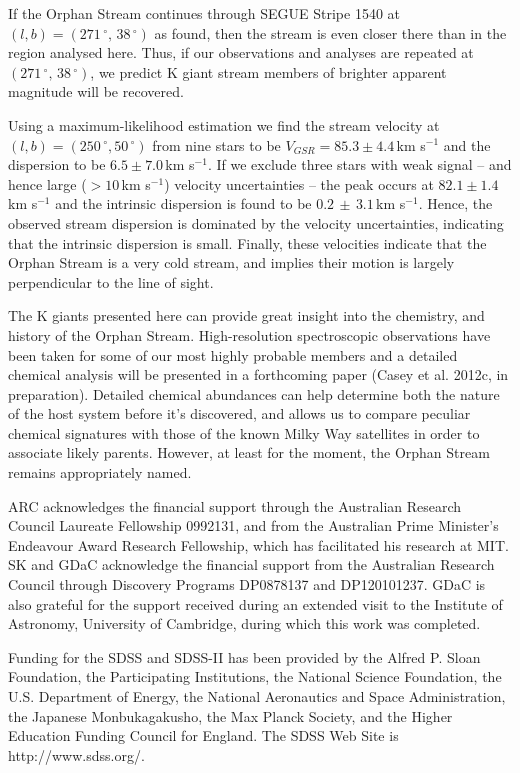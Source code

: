\documentclass{emulateapj}
\begin{document}
If the Orphan Stream continues through SEGUE Stripe 1540 at $(l, b) = (271\,^\circ,\,38\,^\circ)$ as \citet{Newberg;et-al_2010} found, then the stream is even closer there than in the region analysed here. Thus, if our observations and analyses are repeated at $(271\,^\circ,\,38\,^\circ)$, we predict K giant stream members of brighter apparent magnitude will be recovered.

Using a maximum-likelihood estimation we find the stream velocity at $(l, b) = (250\,^\circ, 50\,^\circ)$ from nine stars to be $V_{GSR} = 85.3 \pm 4.4$\,km s$^{-1}$ and the dispersion to be $6.5 \pm 7.0$\,km s$^{-1}$. If we exclude three stars with weak signal \--- and hence large ($> 10$\,km s$^{-1}$) velocity uncertainties \--- the peak occurs at $82.1 \pm 1.4$\,km s$^{-1}$ and the intrinsic dispersion is found to be $0.2\,\pm\,3.1$\,km s$^{-1}$. Hence, the observed stream dispersion is dominated by the velocity uncertainties, indicating that the intrinsic dispersion is small. Finally, these velocities indicate that the Orphan Stream is a very cold stream, and implies their motion is largely perpendicular to the line of sight.

The K giants presented here can provide great insight into the chemistry, and history of the Orphan Stream. High-resolution spectroscopic observations have been taken for some of our most highly probable members and a detailed chemical analysis will be presented in a forthcoming paper (Casey et al. 2012c, in preparation). Detailed chemical abundances can help determine both the nature of the host system before it's discovered, and allows us to compare peculiar chemical signatures with those of the known Milky Way satellites in order to associate likely parents. However, at least for the moment, the Orphan Stream remains appropriately named.


\acknowledgements
ARC acknowledges the financial support through the Australian Research Council Laureate Fellowship 0992131, and from the Australian Prime Minister's Endeavour Award Research Fellowship, which has facilitated his research at MIT. SK and GDaC acknowledge the financial support from the Australian Research Council through Discovery Programs DP0878137 and DP120101237. GDaC is also grateful for the support received during an extended visit to the Institute of Astronomy, University of Cambridge, during which this work was completed.

Funding for the SDSS and SDSS-II has been provided by the Alfred P. Sloan Foundation, the Participating Institutions, the National Science Foundation, the U.S. Department of Energy, the National Aeronautics and Space Administration, the Japanese Monbukagakusho, the Max Planck Society, and the Higher Education Funding Council for England. The SDSS Web Site is http://www.sdss.org/.
\end{document}
